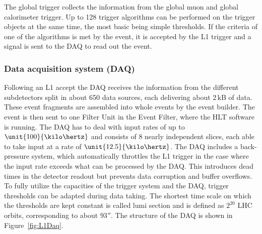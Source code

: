The global trigger collects the information from the global muon and global calorimeter trigger. Up to 128 trigger algorithms can be performed on the trigger objects at the same time, the most basic being simple \pt thresholds. If the criteria of one of the algorithms is met by the event, it is accepted by the L1 trigger and a signal is sent to the DAQ to read out the event.  


\subsubsection*{Data acquisition system (DAQ)}
Following an L1 accept the DAQ receives the information from the different subdetectors split in about 650 data sources, each delivering about 2\,kB of data. These event fragments are assembled into whole events by the event builder. The event is then sent to one Filter Unit in the Event Filter, where the HLT software is running. The DAQ has to deal with input rates of up to $\unit{100}{\kilo\hertz}$ and consists of 8 nearly independent slices, each able to take input at a rate of $\unit{12.5}{\kilo\hertz}$. The DAQ includes a back-pressure system, which automatically throttles the L1 trigger in the case where the input rate exceeds what can be processed by the DAQ. This introduces dead times in the detector readout but prevents data corruption and buffer overflows. To fully utilize the capacities of the trigger system and the DAQ, trigger thresholds can be adapted during data taking. The shortest time scale on which the thresholds are kept constant is called lumi section and is defined as $2^{20}$ LHC orbits, corresponding to about $\unit{93}{\second}$. The structure of the DAQ is shown in Figure~\ref{fig:L1Daq}.
